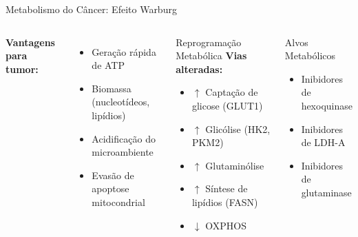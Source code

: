 \begin{frame}{Metabolismo do Câncer: Efeito Warburg}
\begin{columns}

\vspace{0.3cm}

\textbf{Vantagens para tumor:}
\begin{itemize}
    \item Geração rápida de ATP
    \item Biomassa (nucleotídeos, lipídios)
    \item Acidificação do microambiente
    \item Evasão de apoptose mitocondrial
\end{itemize}

\begin{block}{Reprogramação Metabólica}
\textbf{Vias alteradas:}
\begin{itemize}
    \item $\uparrow$ Captação de glicose (GLUT1)
    \item $\uparrow$ Glicólise (HK2, PKM2)
    \item $\uparrow$ Glutaminólise
    \item $\uparrow$ Síntese de lipídios (FASN)
    \item $\downarrow$ OXPHOS
\end{itemize}
\end{block}

\begin{exampleblock}{Alvos Metabólicos}
\begin{itemize}
    \item Inibidores de hexoquinase
    \item Inibidores de LDH-A
    \item Inibidores de glutaminase
\end{itemize}
\end{exampleblock}
\end{columns}
\end{frame}

